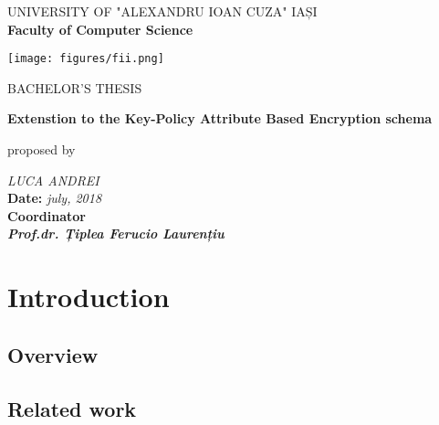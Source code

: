 \documentclass[12pt]{article}
\newcommand\blankpage{%
    \null
    \thispagestyle{empty}%
    \addtocounter{page}{-1}%
    \newpage}
\begin{document}
\begin{titlepage}

\begin{center}

UNIVERSITY OF "ALEXANDRU IOAN CUZA" IAȘI
\\
\textbf{Faculty of Computer Science}
\end{center}

   \vspace{20mm}

\begin{center}
    \texttt{[image: figures/fii.png]}
\end{center}
   \vspace{10mm}
\begin{center}
	\Large{BACHELOR'S THESIS}\\
	
	\vspace{10mm}
	
	\large \textbf{Extenstion to the Key-Policy Attribute Based Encryption schema}\\
	\vspace{5mm}
	
	proposed by
	
	\vspace{5mm}
	\large\textit {LUCA ANDREI}
	\\
	\vspace{20mm}
	\textbf{Date: }\textit{july, 2018}\\
	\vspace{10mm}
	\textbf{Coordinator}\\
	\textbf{\textit{Prof.dr. Țiplea Ferucio Laurențiu}}
	\vspace{30mm}
\end{center}
\end{titlepage} 

\afterpage{\blankpage}

\onecolumn
\tableofcontents
\twocolumn

\onecolumn

\section{Introduction}



\subsection{Overview}

\subsection{Related work}
\end{document}
